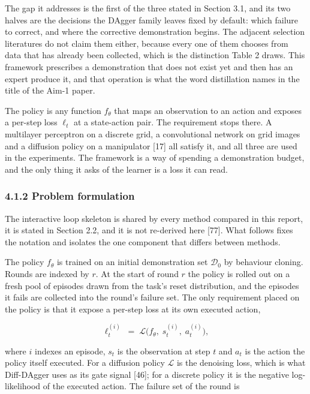 \documentclass[
  11pt,
]{article}
\begin{document}
The gap it addresses is the first of the three stated in Section 3.1,
and its two halves are the decisions the DAgger family leaves fixed by
default: which failure to correct, and where the corrective
demonstration begins. The adjacent selection literatures do not claim
them either, because every one of them chooses from data that has
already been collected, which is the distinction Table 2 draws. This
framework prescribes a demonstration that does not exist yet and then
has an expert produce it, and that operation is what the word
distillation names in the title of the Aim-1 paper.

The policy is any function \(f_\theta\) that maps an observation to an
action and exposes a per-step loss \(\ell_t\) at a state-action pair.
The requirement stops there. A multilayer perceptron on a discrete grid,
a convolutional network on grid images and a diffusion policy on a
manipulator {[}17{]} all satisfy it, and all three are used in the
experiments. The framework is a way of spending a demonstration budget,
and the only thing it asks of the learner is a loss it can read.

\hypertarget{problem-formulation}{%
\subsubsection{4.1.2 Problem formulation}\label{problem-formulation}}

The interactive loop skeleton is shared by every method compared in this
report, it is stated in Section 2.2, and it is not re-derived here
{[}77{]}. What follows fixes the notation and isolates the one component
that differs between methods.

The policy \(f_\theta\) is trained on an initial demonstration set
\(\mathcal{D}_0\) by behaviour cloning. Rounds are indexed by \(r\). At
the start of round \(r\) the policy is rolled out on a fresh pool of
episodes drawn from the task's reset distribution, and the episodes it
fails are collected into the round's failure set. The only requirement
placed on the policy is that it expose a per-step loss at its own
executed action,

\[\ell^{(i)}_t \;=\; \mathcal{L}\big(f_\theta,\; s^{(i)}_t,\; a^{(i)}_t\big), \tag{1}\]

where \(i\) indexes an episode, \(s_t\) is the observation at step \(t\)
and \(a_t\) is the action the policy itself executed. For a diffusion
policy \(\mathcal{L}\) is the denoising loss, which is what Diff-DAgger
uses as its gate signal {[}46{]}; for a discrete policy it is the
negative log-likelihood of the executed action. The failure set of the
round is
\end{document}
